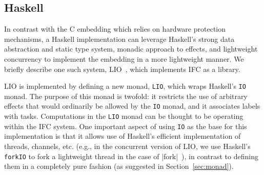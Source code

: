 

\subsection{Haskell}
\label{sec:real:hs}
In contrast with the C embedding which relies on hardware protection
mechanisms, a Haskell implementation can leverage Haskell's strong data
abstraction and static type system, monadic approach to effects, and
lightweight concurrency to implement the embedding in a more lightweight
manner.  We briefly describe one such system, LIO~\cite{lio}, which
implements IFC as a library.

LIO is implemented by defining a new monad, \verb|LIO|, which wraps Haskell's \verb|IO|
monad.
%
The purpose of this monad is twofold: it restricts the use of
arbitrary effects that would ordinarily be allowed by the \verb|IO| monad,
and it associates labels with tasks.
%
Computations in the \verb|LIO|
monad can be thought to be operating within the IFC system.
%
One important aspect of using \verb|IO| as the base for this
implementation is that it allows use of Haskell's efficient
implementation of threads, channels, etc. (e.g., in the concurrent
version of LIO, we use Haskell's \texttt{forkIO} to fork a lightweight
thread in the case of |fork|~\cite{stefan:addressing-covert}), in
contrast to defining them in a completely pure fashion (as suggested
in Section~\ref{sec:monad}).

